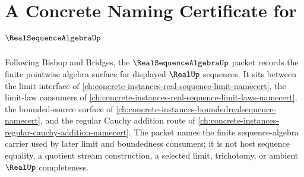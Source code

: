 \chapter{A Concrete Naming Certificate for $\RealSequenceAlgebraUp$}
\label{ch:concrete-instances-real-sequence-algebra-namecert}

Following Bishop and Bridges, the $\RealSequenceAlgebraUp$ packet records the finite pointwise algebra surface for displayed $\RealUp$ sequences. It sits between the limit interface of \autoref{ch:concrete-instances-real-sequence-limit-namecert}, the limit-law consumers of \autoref{ch:concrete-instances-real-sequence-limit-laws-namecert}, the bounded-source surface of \autoref{ch:concrete-instances-boundedrealsequence-namecert}, and the regular Cauchy addition route of \autoref{ch:concrete-instances-regular-cauchy-addition-namecert}. The packet names the finite sequence-algebra carrier used by later limit and boundedness consumers; it is not host sequence equality, a quotient stream construction, a selected limit, trichotomy, or ambient $\RealUp$ completeness.

